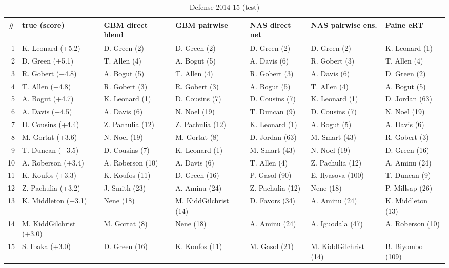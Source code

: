\documentclass[10pt]{article}
\begin{document}
\begin{table}[ht]\centering\scriptsize
\caption{Defense 2014-15 (test)}
\begin{tabular}{rllllll}
\toprule
\# & true (score) & GBM direct blend & GBM pairwise & NAS direct net & NAS pairwise ens. & Paine eRT \\
\midrule
1 & K. Leonard (+5.2) & D. Green (2) & D. Green (2) & D. Green (2) & D. Green (2) & K. Leonard (1) \\
2 & D. Green (+5.1) & T. Allen (4) & A. Bogut (5) & A. Davis (6) & R. Gobert (3) & T. Allen (4) \\
3 & R. Gobert (+4.8) & A. Bogut (5) & T. Allen (4) & R. Gobert (3) & A. Davis (6) & D. Green (2) \\
4 & T. Allen (+4.8) & R. Gobert (3) & R. Gobert (3) & A. Bogut (5) & T. Allen (4) & A. Bogut (5) \\
5 & A. Bogut (+4.7) & K. Leonard (1) & D. Cousins (7) & D. Cousins (7) & K. Leonard (1) & D. Jordan (63) \\
6 & A. Davis (+4.5) & A. Davis (6) & N. Noel (19) & T. Duncan (9) & D. Cousins (7) & N. Noel (19) \\
7 & D. Cousins (+4.4) & Z. Pachulia (12) & Z. Pachulia (12) & K. Leonard (1) & A. Bogut (5) & A. Davis (6) \\
8 & M. Gortat (+3.6) & N. Noel (19) & M. Gortat (8) & D. Jordan (63) & M. Smart (43) & R. Gobert (3) \\
9 & T. Duncan (+3.5) & D. Cousins (7) & K. Leonard (1) & M. Smart (43) & N. Noel (19) & D. Green (16) \\
10 & A. Roberson (+3.4) & A. Roberson (10) & A. Davis (6) & T. Allen (4) & Z. Pachulia (12) & A. Aminu (24) \\
11 & K. Koufos (+3.3) & K. Koufos (11) & D. Green (16) & P. Gasol (90) & E. Ilyasova (100) & T. Duncan (9) \\
12 & Z. Pachulia (+3.2) & J. Smith (23) & A. Aminu (24) & Z. Pachulia (12) & Nene (18) & P. Millsap (26) \\
13 & K. Middleton (+3.1) & Nene (18) & M. KiddGilchrist (14) & D. Favors (34) & A. Aminu (24) & K. Middleton (13) \\
14 & M. KiddGilchrist (+3.0) & M. Gortat (8) & Nene (18) & A. Aminu (24) & A. Iguodala (47) & A. Roberson (10) \\
15 & S. Ibaka (+3.0) & D. Green (16) & K. Koufos (11) & M. Gasol (21) & M. KiddGilchrist (14) & B. Biyombo (109) \\
\bottomrule
\end{tabular}
\end{table}
\end{document}
